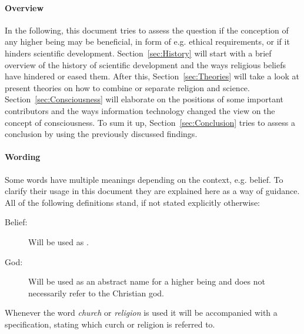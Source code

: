 \paragraph{Overview}
In the following, this document tries to assess the question if the conception of any higher being may be beneficial, in form of e.g. ethical requirements, or if it hinders scientific development.
Section~\ref{sec:History} will start with a brief overview of the history of scientific development and the ways religious beliefs have hindered or eased them.
After this, Section~\ref{sec:Theories} will take a look at present theories on how to combine or separate religion and science.
Section~\ref{sec:Consciousness} will elaborate on the positions of some important contributors and the ways information technology changed the view on the concept of consciousness.
To sum it up, Section~\ref{sec:Conclusion} tries to assess a conclusion by using the previously discussed findings.

\paragraph{Wording}
Some words have multiple meanings depending on the context, e.g. belief.
To clarify their usage in this document they are explained here as a way of guidance.
All of the following definitions stand, if not stated explicitly otherwise:
\begin{description}
    \item[Belief:] Will be used as .
    \item[God:] Will be used as an abstract name for a higher being and does not necessarily refer to the Christian god.
\end{description}
Whenever the word \emph{church} or \emph{religion} is used it will be accompanied with a specification, stating which curch or religion is referred to.
